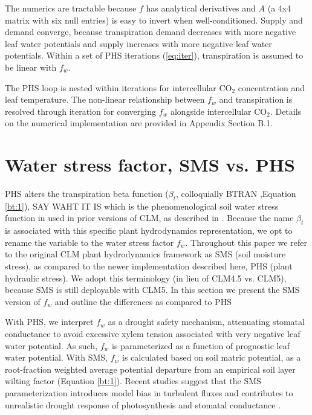 \documentclass[draft,linenumbers]{agujournal}
\begin{document}
    The numerics are tractable because $f$ has analytical derivatives and $A$ (a 4x4 matrix with six null entries) is easy to invert when well-conditioned. Supply and demand converge, because transpiration demand decreases with more negative leaf water potentials and supply increases with more negative leaf water potentials. Within a set of PHS iterations (\ref{eq:iter}), transpiration is assumed to be linear with $f_w$.
    
    The PHS loop is nested within iterations for intercellular CO$_2$ concentration and leaf temperature. The non-linear relationship between $f_w$ and transpiration is resolved through iteration for converging $f_w$ alongside intercellular CO$_2$. Details on the numerical implementation are provided in Appendix Section B.1.


\section{Water stress factor, SMS vs. PHS}
\label{sect:btran}
    PHS alters the transpiration beta function ($\beta_t$, colloquially BTRAN ,Equation \ref{bt:1}), SAY WAHT IT IS which is the phenomenological soil water stress function in used in prior versions of CLM, as described in \citet{oleson2013}. Because the name $\beta_t$ is associated with this specific plant hydrodynamics representation, we opt to rename the variable to the water stress factor $f_w$. Throughout this paper we refer to the original CLM plant hydrodynamics framework as SMS (soil moisture stress), as compared to the newer implementation described here, PHS (plant hydraulic stress). We adopt this terminology (in lieu of CLM4.5 vs. CLM5), because SMS is still deployable with CLM5.   In this section we present the SMS version of $f_w$ and outline the differences as compared to PHS
    
    With PHS, we interpret $f_w$ as a drought safety mechanism, attenuating stomatal conductance to avoid excessive xylem tension associated with very negative leaf water potential. As such, $f_w$ is parameterized as a function of prognostic leaf water potential. With SMS, $f_w$ is calculated based on soil matric potential, as a root-fraction weighted average potential departure from an empirical soil layer wilting factor (Equation \ref{bt:1}). Recent studies suggest that the SMS parameterization introduces model bias in turbulent fluxes \citep{bonan2014} and contributes to unrealistic drought response of photosynthesis and stomatal conductance \citep{powell2013}.
    
\end{document}

